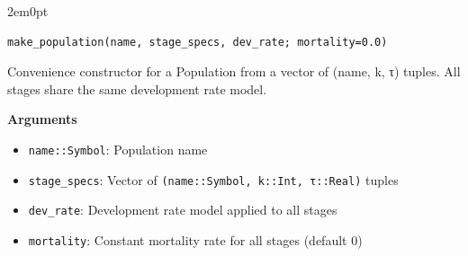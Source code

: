 \begin{adjustwidth}{2em}{0pt}


\begin{verbatim}
make_population(name, stage_specs, dev_rate; mortality=0.0)
\end{verbatim}

Convenience constructor for a Population from a vector of (name, k, τ) tuples. All stages share the same development rate model.

\textbf{Arguments}

\begin{itemize}
\item \texttt{name::Symbol}: Population name


\item \texttt{stage\_specs}: Vector of \texttt{(name::Symbol, k::Int, τ::Real)} tuples


\item \texttt{dev\_rate}: Development rate model applied to all stages


\item \texttt{mortality}: Constant mortality rate for all stages (default 0)

\end{itemize}


\end{adjustwidth}


